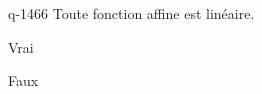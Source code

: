 \begin{truefalse}{q-1466}
Toute fonction affine est linéaire.
\item Vrai
\item* Faux
\end{truefalse}

